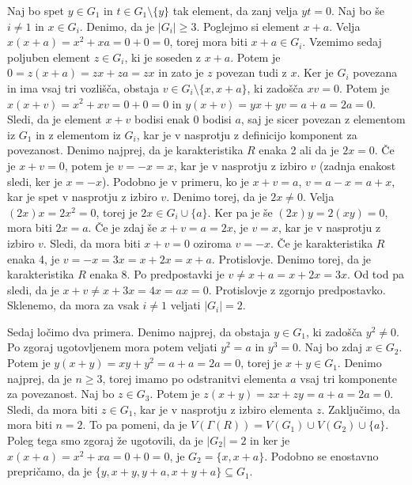 \documentclass[a4paper, 12pt]{amsart}
\theoremstyle{definition} %
\theoremstyle{plain} %
\begin{document}
Naj bo spet $y\in G_1$ in $t\in   G_1 \setminus \{y\}$ tak element, da zanj velja $yt = 0$. Naj bo še $i \neq 1$ in $x\in G_i$. Denimo, da je $|G_i|  \ge 3$. Poglejmo si element $x+a$. Velja $x(x+a) = x^2 + xa = 0+ 0 = 0$, torej mora biti $x+a\in G_i$. Vzemimo sedaj poljuben element $z\in G_i$, ki je soseden z $x+a$. Potem je $0=z(x+a) =zx + za =zx$ in zato je $z$ povezan tudi z $x$. Ker je $G_i$ povezana in ima vsaj tri vozlišča, obstaja $v\in G_i \setminus \{x,x+a\}$, ki zadošča $xv = 0$. Potem je $x(x+v) = x^2 + xv = 0 + 0 = 0$ in $y(x+v) = yx +yv = a + a = 2a = 0$. Sledi, da je element $x+v$ bodisi enak 0 bodisi $a$, saj je sicer povezan z elementom iz $G_1$ in z elementom iz $G_i$, kar je v nasprotju z definicijo komponent za povezanost.
Denimo najprej, da je karakteristika $R$ enaka 2 ali da je $2x=0$. Če je $x+v=0$, potem je $v=-x=x$, kar je v nasprotju z izbiro $v$ (zadnja enakost sledi, ker je $x=-x$). Podobno je v primeru, ko je $x+v = a$, $v = a-x = a + x$, kar je spet v nasprotju z izbiro $v$. Denimo torej, da je $2x\neq 0$. Velja $(2x)x = 2x^2  = 0$, torej je $2x \in G_i \cup\{a\}$. Ker pa je še $(2x)y = 2 (xy) = 0$, mora biti $2x = a$. Če je zdaj še $x+v = a = 2x$, je $v=x$, kar je v nasprotju z izbiro $v$. Sledi, da mora biti $x+v=0$ oziroma $v=-x$. Če je karakteristika $R$ enaka 4, je $v = - x = 3x = x+ 2x = x+a$. Protislovje. Denimo torej, da je karakteristika $R$ enaka 8. Po predpostavki je $v \neq x+a = x+2x = 3x$. Od tod pa sledi, da je $x+v \neq x+3x = 4x = ax = 0$. Protislovje z zgornjo predpostavko. Sklenemo, da mora  za vsak $i\neq1$ veljati $|G_i| = 2$.

Sedaj ločimo dva primera. Denimo najprej, da obstaja $y\in G_1$, ki zadošča $y^2 \neq 0$. Po zgoraj ugotovljenem mora potem veljati $y^2 = a $ in $y^3 = 0$. Naj bo zdaj $x\in G_2$. Potem je $y(x+y) = xy + y^2 = a +a = 2a = 0$, torej je $x+y\in G_1$. Denimo najprej, da je $n\ge 3$, torej imamo po odstranitvi elementa $a$ vsaj tri komponente za povezanost. Naj bo $z\in G_3$. Potem je $z(x+y) = zx + zy = a+ a= 2a = 0$. Sledi, da mora biti $z\in G_1$, kar je v nasprotju z izbiro elementa $z$. Zaključimo, da mora biti $n=2$. To pa pomeni, da je $V(\Gamma(R)) = V(G_1) \cup V(G_2) \cup \{a\}$. Poleg tega smo zgoraj že ugotovili, da je $|G_2| = 2$  in ker je $x(x+a) = x^2 + xa = 0+0= 0$, je $G_2 = \{x,x+a\}$. Podobno se enostavno prepričamo, da je $\{y,x+y,y+a,x+y+a\}\subseteq G_1$. 
\end{document}
